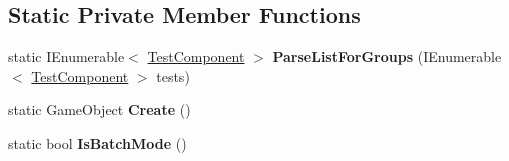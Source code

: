 \subsection*{Static Private Member Functions}
\begin{DoxyCompactItemize}
\item 
\mbox{\label{class_unity_test_1_1_test_runner_afde99fcc749e9919638d39d708abd6bc}} 
static I\+Enumerable$<$ \hyperlink{class_unity_test_1_1_test_component}{Test\+Component} $>$ {\bfseries Parse\+List\+For\+Groups} (I\+Enumerable$<$ \hyperlink{class_unity_test_1_1_test_component}{Test\+Component} $>$ tests)
\item 
\mbox{\label{class_unity_test_1_1_test_runner_a55550470dfe9bc28a3032a23e3c3cd83}} 
static Game\+Object {\bfseries Create} ()
\item 
\mbox{\label{class_unity_test_1_1_test_runner_af86aeb226f819f2ae499cd718fee6403}} 
static bool {\bfseries Is\+Batch\+Mode} ()
\end{DoxyCompactItemize}
